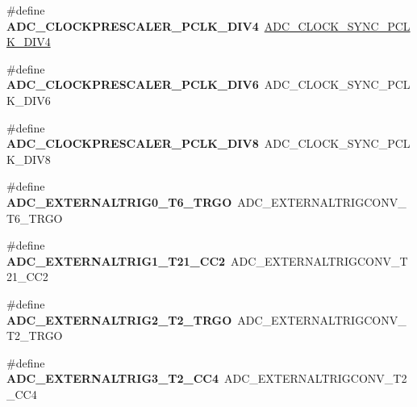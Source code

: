 \begin{DoxyCompactItemize}
\#define {\bfseries A\+D\+C\+\_\+\+C\+L\+O\+C\+K\+P\+R\+E\+S\+C\+A\+L\+E\+R\+\_\+\+P\+C\+L\+K\+\_\+\+D\+I\+V4}~\hyperlink{group___a_d_c___clock_prescaler_ga41b6a6d1cdf7806ec1e5790fc7fdc651}{A\+D\+C\+\_\+\+C\+L\+O\+C\+K\+\_\+\+S\+Y\+N\+C\+\_\+\+P\+C\+L\+K\+\_\+\+D\+I\+V4}
\item 
\mbox{\label{group___h_a_l___a_d_c___aliased___defines_gae5cbf680825b9ccaa02bdbab9217f550}} 
\#define {\bfseries A\+D\+C\+\_\+\+C\+L\+O\+C\+K\+P\+R\+E\+S\+C\+A\+L\+E\+R\+\_\+\+P\+C\+L\+K\+\_\+\+D\+I\+V6}~A\+D\+C\+\_\+\+C\+L\+O\+C\+K\+\_\+\+S\+Y\+N\+C\+\_\+\+P\+C\+L\+K\+\_\+\+D\+I\+V6
\item 
\mbox{\label{group___h_a_l___a_d_c___aliased___defines_ga93ccda8f421de00a2aa5b0b19b665393}} 
\#define {\bfseries A\+D\+C\+\_\+\+C\+L\+O\+C\+K\+P\+R\+E\+S\+C\+A\+L\+E\+R\+\_\+\+P\+C\+L\+K\+\_\+\+D\+I\+V8}~A\+D\+C\+\_\+\+C\+L\+O\+C\+K\+\_\+\+S\+Y\+N\+C\+\_\+\+P\+C\+L\+K\+\_\+\+D\+I\+V8
\item 
\mbox{\label{group___h_a_l___a_d_c___aliased___defines_ga72d7fcd1d65274786de2b3ccd6b853c4}} 
\#define {\bfseries A\+D\+C\+\_\+\+E\+X\+T\+E\+R\+N\+A\+L\+T\+R\+I\+G0\+\_\+\+T6\+\_\+\+T\+R\+GO}~A\+D\+C\+\_\+\+E\+X\+T\+E\+R\+N\+A\+L\+T\+R\+I\+G\+C\+O\+N\+V\+\_\+\+T6\+\_\+\+T\+R\+GO
\item 
\mbox{\label{group___h_a_l___a_d_c___aliased___defines_gab001be8f7abe45ddf92a476a65c6dd50}} 
\#define {\bfseries A\+D\+C\+\_\+\+E\+X\+T\+E\+R\+N\+A\+L\+T\+R\+I\+G1\+\_\+\+T21\+\_\+\+C\+C2}~A\+D\+C\+\_\+\+E\+X\+T\+E\+R\+N\+A\+L\+T\+R\+I\+G\+C\+O\+N\+V\+\_\+\+T21\+\_\+\+C\+C2
\item 
\mbox{\label{group___h_a_l___a_d_c___aliased___defines_gaad24eb6d74f2e4396d59afc4c715a053}} 
\#define {\bfseries A\+D\+C\+\_\+\+E\+X\+T\+E\+R\+N\+A\+L\+T\+R\+I\+G2\+\_\+\+T2\+\_\+\+T\+R\+GO}~A\+D\+C\+\_\+\+E\+X\+T\+E\+R\+N\+A\+L\+T\+R\+I\+G\+C\+O\+N\+V\+\_\+\+T2\+\_\+\+T\+R\+GO
\item 
\mbox{\label{group___h_a_l___a_d_c___aliased___defines_gaa0f8054b3363d13a190ee0d366363575}} 
\#define {\bfseries A\+D\+C\+\_\+\+E\+X\+T\+E\+R\+N\+A\+L\+T\+R\+I\+G3\+\_\+\+T2\+\_\+\+C\+C4}~A\+D\+C\+\_\+\+E\+X\+T\+E\+R\+N\+A\+L\+T\+R\+I\+G\+C\+O\+N\+V\+\_\+\+T2\+\_\+\+C\+C4

\end{DoxyCompactItemize}
